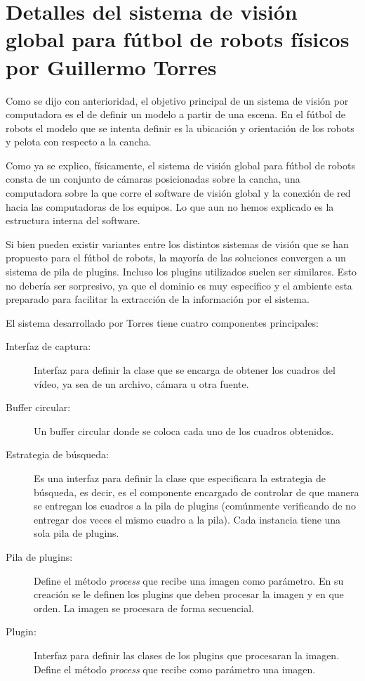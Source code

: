 
\section{Detalles del sistema de visión global para fútbol de robots físicos por
Guillermo Torres}

Como se dijo con anterioridad, el objetivo principal de un sistema de visión por
computadora es el de definir un modelo a partir de una escena. En el fútbol de
robots el modelo que se intenta definir es la ubicación y orientación de los
robots y pelota con respecto a la cancha.

Como ya se explico, físicamente, el sistema de visión global para fútbol de
robots consta de un conjunto de cámaras posicionadas sobre la cancha, una
computadora sobre la que corre el software de visión global y la conexión de red
hacia las computadoras de los equipos. Lo que aun no hemos explicado es la
estructura interna del software.

Si bien pueden existir variantes entre los distintos sistemas de visión que se
han propuesto para el fútbol de robots, la mayoría de las soluciones convergen a
un sistema de pila de plugins. Incluso los plugins utilizados
suelen ser similares. Esto no debería ser sorpresivo, ya que el dominio es muy
especifico y el ambiente esta preparado para facilitar la extracción de la
información por el sistema.

El sistema desarrollado por Torres tiene cuatro componentes principales:

\begin{description}

\item[Interfaz de captura:] Interfaz para definir la clase que se encarga de
	obtener los cuadros del vídeo, ya sea de un archivo, cámara u otra
	fuente.

\item[Buffer circular:] Un buffer circular donde se coloca cada uno de los
	cuadros obtenidos.

\item[Estrategia de búsqueda:] Es una interfaz para definir la clase que
	especificara la estrategia de búsqueda, es decir, es el componente
	encargado de controlar de que manera se entregan los cuadros a la pila
	de plugins (comúnmente verificando de no entregar dos veces el
	mismo cuadro a la pila). Cada instancia tiene una sola pila de
	plugins.
	
\item[Pila de plugins:] Define el método \emph{process} que recibe una imagen
	como parámetro. En su creación se le definen los plugins que
	deben procesar la imagen y en que orden. La imagen se procesara de forma
	secuencial.

\item[Plugin:] Interfaz para definir las clases de los plugins que
	procesaran la imagen. Define el método \emph{process} que recibe como
	parámetro una imagen.

\end{description}

